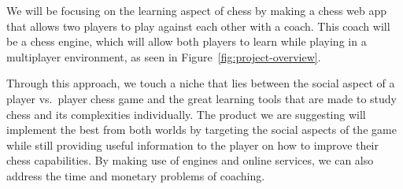 We will be focusing on the learning aspect of chess by making a chess web app that allows two players to play against
each other with a coach.
This coach will be a chess engine, which will allow both players to learn while playing in a multiplayer environment, as
seen in Figure~\ref{fig:project-overview}.

Through this approach, we touch a niche that lies between the social aspect of a player vs.\ player chess game and the
great learning tools that are made to study chess and its complexities individually.
The product we are suggesting will implement the best from both worlds by targeting the social aspects of the game while
still providing useful information to the player on how to improve their chess capabilities.
By making use of engines and online services, we can also address the time and monetary problems of coaching.
